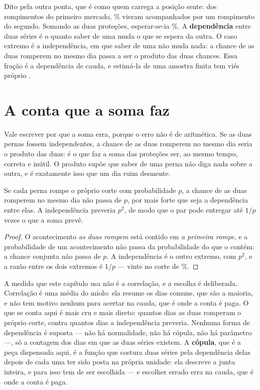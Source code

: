 Dito pela outra ponta, que é como quem carrega a posição sente: dos \numDependenciaRompeA{}
rompimentos do primeiro mercado, \numDependenciaAcompanhadosPct\% vieram acompanhados por um
rompimento do segundo. Somando as duas proteções, esperar-se-ia
\numDependenciaAcompanhadosIndependentePct\%.
A \textbf{dependência} entre duas séries é o quanto saber de uma muda o que se espera da outra.
O caso extremo é a independência, em que saber de uma não muda nada: a chance de as duas
romperem no mesmo dia passa a ser o produto das duas chances. Essa fração é a dependência de
cauda, e estimá-la de uma amostra finita tem viés próprio \cite{garcin2026nonparametric}.

\section{A conta que a soma faz}

Vale escrever por que a soma erra, porque o erro não é de aritmética. Se as duas pernas fossem
independentes, a chance de as duas romperem no mesmo dia seria o produto das duas: é o que faz
a soma das proteções ser, ao mesmo tempo, correta e inútil. O produto supõe que saber de uma
perna não diga nada sobre a outra, e é exatamente isso que um dia ruim desmente.

\begin{proposicao}\label{prop:teto-do-par}
Se cada perna rompe o próprio corte com probabilidade $p$, a chance de as duas romperem no mesmo
dia não passa de $p$, por mais forte que seja a dependência entre elas. A independência preveria
$p^{2}$, de modo que o par pode entregar até $1/p$ vezes o que a soma prevê.
\end{proposicao}

\begin{proof}
O acontecimento \emph{as duas rompem} está contido em \emph{a primeira rompe}, e a probabilidade
de um acontecimento não passa da probabilidade do que o contém: a chance conjunta não passa de
$p$. A independência é o outro extremo, com $p^{2}$, e a razão entre os dois extremos é $1/p$ ---
vinte no corte de \numPromessaPct\%.
\end{proof}

A medida que este capítulo usa não é a correlação, e a escolha é deliberada. Correlação é uma
média do miolo: ela resume os dias comuns, que são a maioria, e não tem motivo nenhum para
acertar na cauda, que é onde a conta é paga. O que se conta aqui é mais cru e mais direto:
quantos dias as duas romperam o próprio corte, contra quantos dias a independência preveria.
Nenhuma forma de dependência é suposta --- não há normalidade, não há cópula, não há parâmetro
---, só a contagem dos dias em que as duas séries existem\cite{pfister2018kernel,szekely2007measuring}.
A \textbf{cópula}, que é a peça dispensada aqui, é a função que costura duas séries pela
dependência delas depois de cada uma ter sido posta na própria unidade: ela descreve a
junta inteira, e para isso tem de ser escolhida\cite{clemente2021calibrating} --- e escolher errado erra na cauda, que é onde a
conta é paga\cite{ansari2021sklar}.

